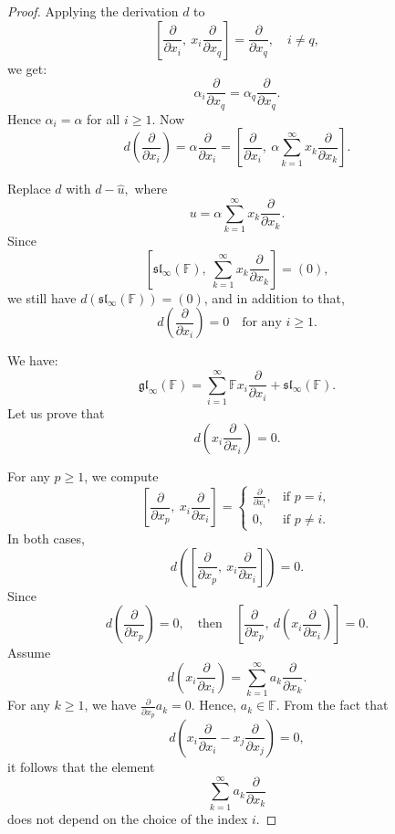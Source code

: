 \documentclass[10pt,a4paper]{amsart}
\begin{document}
\begin{proof}
		
		Applying the derivation $d$ to
		\[
		\left[ \frac{\partial}{\partial x_i}, \ x_i  \frac{\partial}{\partial x_q} \right] = \frac{\partial}{\partial x_q}, \quad i \neq q,
		\] we get: $$ \alpha_i   \frac{\partial}{\partial x_q}= \alpha_q   \frac{\partial}{\partial x_q}.$$ Hence $ \alpha_i =\alpha$  for all $ i\geq 1. $ Now
		\[
		d\left( \frac{\partial}{\partial x_i} \right) = \alpha  \frac{\partial}{\partial x_i} = \left[ \frac{\partial}{\partial x_i}, \ \alpha \sum_{k=1}^{\infty}  x_k  \frac{\partial}{\partial x_k} \right].
		\]
		
		
		Replace \( d \) with $  d - \widehat{u} ,$ where $$ u= \alpha \sum_{k=1}^\infty x_k \frac{\partial}{\partial x_k}.$$
		Since
		\[
		\left[\mathfrak{sl}_\infty(\mathbb{F}), \ \sum_{k=1}^\infty x_k \frac{\partial}{\partial x_k}\right] = (0),
		\]
		we still have \( d(\mathfrak{sl}_\infty(\mathbb{F})) = (0) \),  and in addition to that,
		\[
		d\left( \frac{\partial}{\partial x_i} \right) = 0 \quad \text{for any } i \geq 1.
		\]
		
		We have:
		\[
		\mathfrak{gl}_\infty(\mathbb{F}) = \sum_{i=1}^\infty \mathbb{F} x_i \frac{\partial}{\partial x_i} + \mathfrak{sl}_\infty(\mathbb{F}).
		\] Let us prove that \[
		d\left( x_i \frac{\partial}{\partial x_i}\right) = 0.
		\] 
		
		For any \( p \geq 1 \), we compute
		\[
		\left[ \frac{\partial}{\partial x_p}, \ x_i \frac{\partial}{\partial x_i} \right] =
		\begin{cases}
			\frac{\partial}{\partial x_i}, & \text{if } p = i, \\
			0, & \text{if } p \neq i.
		\end{cases}
		\] In both cases,
		\[
		d\left( \left[ \frac{\partial}{\partial x_p}, \ x_i \frac{\partial}{\partial x_i} \right] \right) = 0.
		\]
		Since $$ d\left( \frac{\partial}{\partial x_p} \right) = 0,  \quad \text{then} \quad 
		\left[ \frac{\partial}{\partial x_p},\  d \left( x_i \frac{\partial}{\partial x_i} \right) \right] = 0.$$
		Assume
		\[
		d \left( x_i \frac{\partial}{\partial x_i} \right) = \sum_{k=1}^{\infty} a_k \frac{\partial}{\partial x_k}.
		\]
		For any \( k \geq 1 \), we have \( \frac{\partial}{\partial x_p} a_k = 0 \). Hence, \( a_k \in \mathbb{F} \). From the fact that 
		\[
		d \left( x_i \frac{\partial}{\partial x_i} - x_j \frac{\partial}{\partial x_j} \right) = 0,
		\]
		it follows that the element 
		\[
		\sum_{k = 1}^{\infty} a_k \frac{\partial}{\partial x_k}
		\]
		does not depend on the choice of the index  \( i \).
		

\end{proof}
\end{document}
